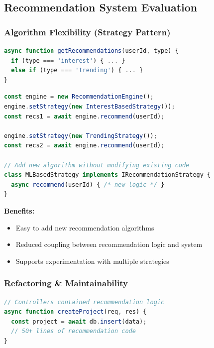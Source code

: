 \documentclass[a4paper,12pt]{report}
\begin{document}
\subsection*{Recommendation System Evaluation}

\subsubsection*{Algorithm Flexibility (Strategy Pattern)}

\begin{lstlisting}[language=JavaScript,style=professional,caption={Before Strategy - Monolithic Logic},captionpos=t]
async function getRecommendations(userId, type) {
  if (type === 'interest') { ... }
  else if (type === 'trending') { ... }
}
\end{lstlisting}

\begin{lstlisting}[language=JavaScript,style=professional,caption={After Strategy - Pluggable Algorithms},captionpos=t]
const engine = new RecommendationEngine();
engine.setStrategy(new InterestBasedStrategy());
const recs1 = await engine.recommend(userId);

engine.setStrategy(new TrendingStrategy());
const recs2 = await engine.recommend(userId);

// Add new algorithm without modifying existing code
class MLBasedStrategy implements IRecommendationStrategy {
  async recommend(userId) { /* new logic */ }
}
\end{lstlisting}

\textbf{Benefits:}  
\begin{itemize}
    \item Easy to add new recommendation algorithms
    \item Reduced coupling between recommendation logic and system
    \item Supports experimentation with multiple strategies
\end{itemize}

\subsubsection*{Refactoring \& Maintainability}

\begin{lstlisting}[language=javascript,style=professional,caption={Before: Recommendation logic scattered in controllers},captionpos=t]
// Controllers contained recommendation logic
async function createProject(req, res) {
  const project = await db.insert(data);
  // 50+ lines of recommendation code
}
\end{lstlisting}
\end{document}
